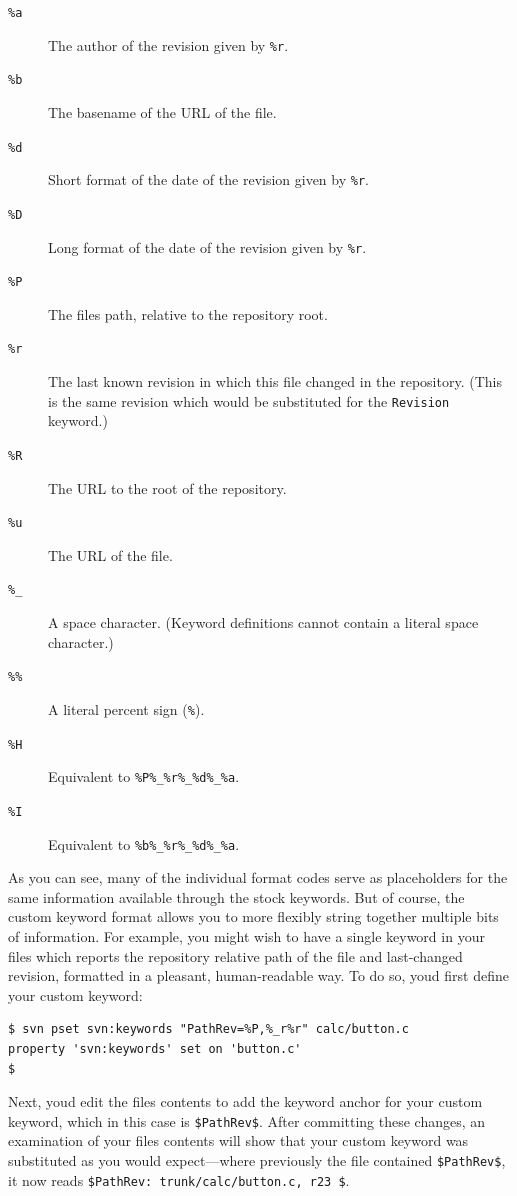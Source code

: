\begin{description}
\item[\texttt{\%a}]
The author of the revision given by \texttt{\%r}.
\item[\texttt{\%b}]
The basename of the URL of the file.
\item[\texttt{\%d}]
Short format of the date of the revision given by \texttt{\%r}.
\item[\texttt{\%D}]
Long format of the date of the revision given by \texttt{\%r}.
\item[\texttt{\%P}]
The file\textquotesingle s path, relative to the repository root.
\item[\texttt{\%r}]
The last known revision in which this file changed in the repository.
(This is the same revision which would be substituted for the
\texttt{Revision} keyword.)
\item[\texttt{\%R}]
The URL to the root of the repository.
\item[\texttt{\%u}]
The URL of the file.
\item[\texttt{\%\_}]
A space character. (Keyword definitions cannot contain a literal space
character.)
\item[\texttt{\%\%}]
A literal percent sign (\textquotesingle{}\texttt{\%}\textquotesingle).
\item[\texttt{\%H}]
Equivalent to \texttt{\%P\%\_\%r\%\_\%d\%\_\%a}.
\item[\texttt{\%I}]
Equivalent to \texttt{\%b\%\_\%r\%\_\%d\%\_\%a}.
\end{description}

As you can see, many of the individual format codes serve as
placeholders for the same information available through the stock
keywords. But of course, the custom keyword format allows you to more
flexibly string together multiple bits of information. For example, you
might wish to have a single keyword in your files which reports the
repository relative path of the file and last-changed revision,
formatted in a pleasant, human-readable way. To do so,
you\textquotesingle d first define your custom keyword:

\begin{verbatim}
$ svn pset svn:keywords "PathRev=%P,%_r%r" calc/button.c
property 'svn:keywords' set on 'button.c'
$
\end{verbatim}

Next, you\textquotesingle d edit the file\textquotesingle s contents to
add the keyword anchor for your custom keyword, which in this case is
\texttt{\$PathRev\$}. After committing these changes, an examination of
your file\textquotesingle s contents will show that your custom keyword
was substituted as you would expect---where previously the file
contained \texttt{\$PathRev\$}, it now reads
\texttt{\$PathRev:\ trunk/calc/button.c,\ r23\ \$}.

